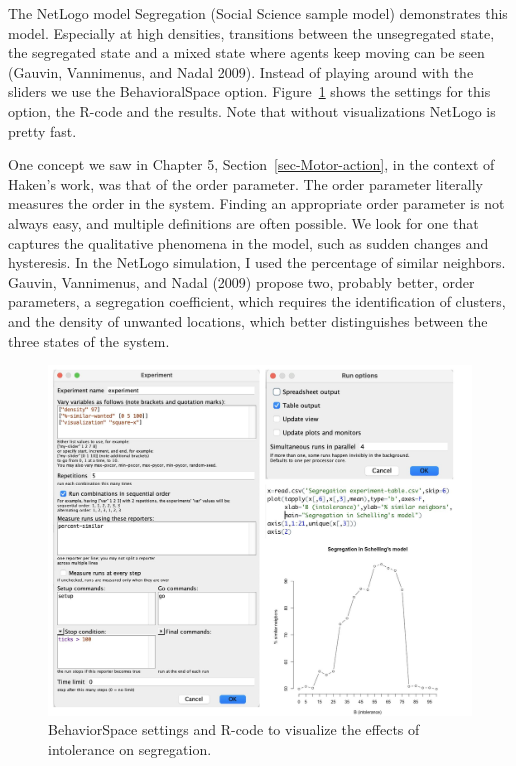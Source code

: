 \documentclass[
  a4paper,
  DIV=11,
  numbers=noendperiod]{scrreprt}
\begin{document}
The NetLogo model Segregation (Social Science sample model) demonstrates
this model. Especially at high densities, transitions between the
unsegregated state, the segregated state and a mixed state where agents
keep moving can be seen (Gauvin, Vannimenus, and Nadal 2009). Instead of
playing around with the sliders we use the BehavioralSpace option.
Figure~\ref{fig-ch7-img1-old-89} shows the settings for this option, the
R-code and the results. Note that without visualizations NetLogo is
pretty fast.

One concept we saw in Chapter 5, Section~\ref{sec-Motor-action}, in the
context of Haken's work, was that of the order parameter. The order
parameter literally measures the order in the system. Finding an
appropriate order parameter is not always easy, and multiple definitions
are often possible. We look for one that captures the qualitative
phenomena in the model, such as sudden changes and hysteresis. In the
NetLogo simulation, I used the percentage of similar neighbors. Gauvin,
Vannimenus, and Nadal (2009) propose two, probably better, order
parameters, a segregation coefficient, which requires the identification
of clusters, and the density of unwanted locations, which better
distinguishes between the three states of the system.

\begin{figure}

{\centering \includegraphics{media/ch7/image1.jpg}

}

\caption{\label{fig-ch7-img1-old-89}BehaviorSpace settings and R-code to
visualize the effects of intolerance on segregation.}

\end{figure}
\end{document}
